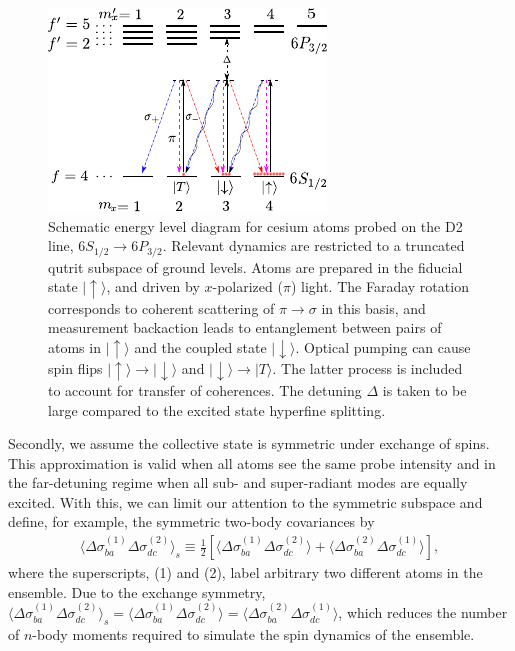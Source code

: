 \documentclass[preprint,aps,pra,onecolumn,superscriptaddress]{revtex4-1} %
\def\ket#1{\lvert{#1}\rangle}%
\newcommand{\expect}[1]{\big\langle #1 \big\rangle}
\begin{document}
\begin{figure}[htb]
\centering
  \includegraphics[width=.45\textwidth]{fig/FaradaySqueezingLevelStructure}
  \caption{Schematic energy level diagram for cesium atoms probed on the D2 line, $6S_{1/2} \rightarrow 6P_{3/2}$.  Relevant dynamics are restricted to a truncated qutrit subspace of ground levels.  Atoms are prepared in the fiducial state $\ket{\uparrow}$, and driven by $x$-polarized ($\pi$) light.  The Faraday rotation corresponds to coherent scattering of $\pi \rightarrow \sigma$ in this basis, and measurement backaction leads to entanglement between pairs of atoms in $\ket{\uparrow}$ and the coupled state $\ket{\downarrow}$.  Optical pumping can cause spin flips $\ket{\uparrow} \rightarrow \ket{\downarrow}$ and $ \ket{\downarrow} \rightarrow  \ket{T}$.  The latter process is included to account for transfer of coherences.  The detuning $\Delta$ is taken to be large compared to the excited state hyperfine splitting.}
  \label{fig:spinsqueezinglevelstructure}
\end{figure}

Secondly, we assume the collective state is symmetric under exchange of spins. This approximation is valid when all atoms see the same probe intensity and in the far-detuning regime when all sub- and super-radiant modes are equally excited. With this, we can limit our attention to the symmetric subspace and define, for example, the symmetric two-body covariances by
\begin{align}
\expect{\Delta\sigma_{ba}^{(1)}\Delta\sigma_{dc}^{(2)}}_s \equiv \frac{1}{2}\left[\expect{\Delta\sigma_{ba}^{(1)}\Delta\sigma_{dc}^{(2)}}+\expect{\Delta\sigma_{ba}^{(2)}\Delta\sigma_{dc}^{(1)}} \right] ,
\end{align}
where the superscripts, (1) and (2), label arbitrary two different atoms in the ensemble. Due to the exchange symmetry, $ \expect{\Delta\sigma_{ba}^{(1)}\Delta\sigma_{dc}^{(2)}}_s=\expect{\Delta\sigma_{ba}^{(1)}\Delta\sigma_{dc}^{(2)}}=\expect{\Delta\sigma_{ba}^{(2)}\Delta\sigma_{dc}^{(1)}} $, which reduces the number of $ n $-body moments required to simulate the spin dynamics of the ensemble.
\end{document}
